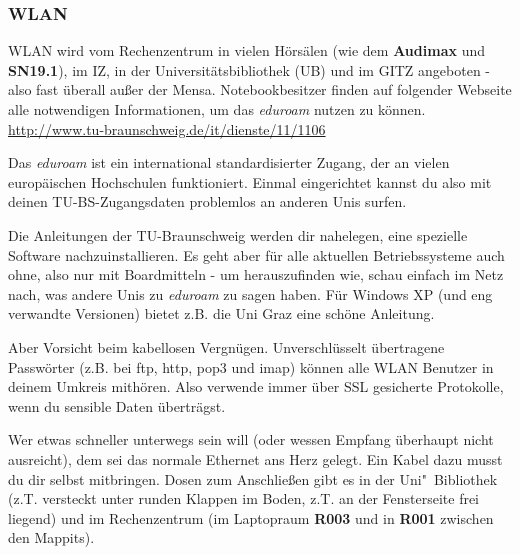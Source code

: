\begin{multicols}{2}
	\subsubsection{WLAN}
		\label{wlan}
		WLAN wird vom Rechenzentrum in vielen Hörsälen (wie dem \textbf{Audimax} und \textbf{SN19.1}), im IZ, in der Universitätsbibliothek (UB) und im GITZ angeboten - also fast überall außer der Mensa. Notebookbesitzer finden auf folgender Webseite alle notwendigen Informationen, um das \emph{eduroam} nutzen zu können. \url{http://www.tu-braunschweig.de/it/dienste/11/1106}

		Das \emph{eduroam} ist ein international standardisierter Zugang, der an vielen europäischen Hochschulen funktioniert. Einmal eingerichtet kannst du also mit deinen TU-BS-Zugangsdaten problemlos an anderen Unis surfen.

		Die Anleitungen der TU-Braunschweig werden dir nahelegen, eine spezielle Software nachzuinstallieren. Es geht aber für alle aktuellen Betriebssysteme auch ohne, also nur mit Boardmitteln - um herauszufinden wie, schau einfach im Netz nach, was andere Unis zu \emph{eduroam} zu sagen haben. Für Windows XP (und eng verwandte Versionen) bietet z.B. die Uni Graz eine schöne Anleitung.

		Aber Vorsicht beim kabellosen Vergnügen. Unverschlüsselt übertragene Passwörter (z.B. bei ftp, http, pop3 und imap) können alle WLAN Benutzer in deinem Umkreis mithören. Also verwende immer über SSL gesicherte Protokolle, wenn du sensible Daten überträgst.

		Wer etwas schneller unterwegs sein will (oder wessen Empfang überhaupt nicht ausreicht), dem sei das normale Ethernet ans Herz gelegt. Ein Kabel dazu musst du dir selbst mitbringen. Dosen zum Anschließen gibt es in der Uni"~Bibliothek (z.T. versteckt unter runden Klappen im Boden, z.T. an der Fensterseite frei liegend) und im Rechenzentrum (im Laptopraum \textbf{R003} und in \textbf{R001} zwischen den Mappits).


\end{multicols}

